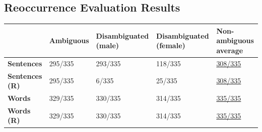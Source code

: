




\subsection{Reoccurrence Evaluation Results}
\label{ch:Base_Experiment:Results:Reoccurrence}

\begin{table}[!htb] 
    \begin{subtable}{\textwidth}
        \centering
        \begin{tabularx}{\linewidth}{|X|XXXX|}
            \hline
             & \textbf{Ambiguous} & \textbf{Disambiguated (male)} & \textbf{Disambiguated (female)} & \textbf{Non-ambiguous average} \\ \hline
             \textbf{Sentences} & 295/335 & 293/335 & 118/335 & \underline{308/335} \\
             \textbf{Sentences (R)} & 295/335 & 6/335 & 25/335 & \underline{308/335} \\ \hline
             \textbf{Words} & 329/335 & 330/335 & 314/335 & \underline{335/335} \\ 
             \textbf{Words (R)} & 329/335 & 330/335 & 314/335 & \underline{335/335} \\ \hline
        \end{tabularx}
        \label{tab:reoccurrence_10}
    \end{subtable}
    

\end{table}
